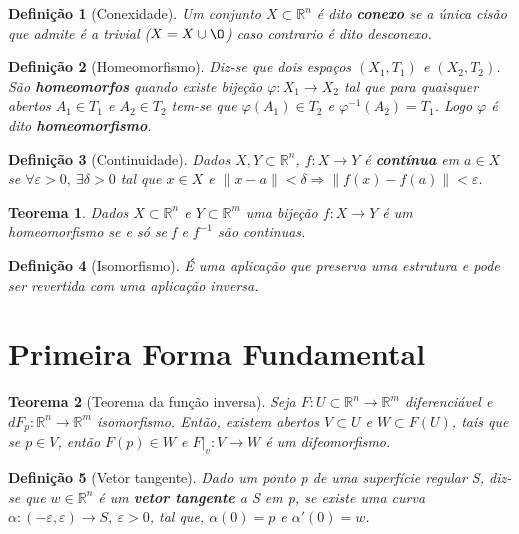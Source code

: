\documentclass[12pt]{article}
\newtheorem{theorem}{Teorema}
\newtheorem{definition}{Definição}
\begin{document}
\begin{definition}[Conexidade]
Um conjunto $X \subset \mathbb{R}^n$ é dito \textbf{conexo} se a única cisão que admite é a trivial ($X = X \cup \O$) caso contrario é dito desconexo.
\end{definition}

\begin{definition}[Homeomorfismo]
Diz-se que dois espaços $(X_1, T_1)$ e $(X_2, T_2)$. São \textbf{homeomorfos} quando existe bijeção $\varphi: X_1 \rightarrow X_2$ tal que para quaisquer abertos $A_1 \in T_1$ e $A_2 \in T_2$ tem-se que $\varphi(A_1) \in T_2$ e $\varphi^{-1}(A_2) = T_1$. Logo $\varphi$ é dito \textbf{homeomorfismo}.
\end{definition}

\begin{definition}[Continuidade]
Dados $X, Y \subset \mathbb{R}^n$, $f: X \rightarrow Y$ é \textbf{contínua} em $a \in X$ se $\forall \varepsilon > 0,\ \exists \delta > 0$ tal que $x \in X$ e $\| x - a \| < \delta \Rightarrow \| f(x) - f(a) \| < \varepsilon$.
\end{definition}

\begin{theorem}
Dados $X \subset \mathbb{R}^n$ e $Y \subset \mathbb{R}^m$ uma bijeção $f: X \rightarrow Y$ é um homeomorfismo se e só se f e $f^{-1}$ são continuas.
\end{theorem}

\begin{definition}[Isomorfismo]
É uma aplicação que preserva uma estrutura e pode ser revertida com uma aplicação inversa.
\end{definition}

\section*{Primeira Forma Fundamental}
\begin{theorem}[Teorema da função inversa]
Seja $F: U \subset \mathbb{R}^n \rightarrow \mathbb{R}^m$ diferenciável e $dF_p : \mathbb{R}^n \rightarrow \mathbb{R}^m$ isomorfismo. Então, existem abertos $V \subset U$ e $W \subset F(U)$, tais que se $p \in V$, então $F(p) \in W$ e $F|_v : V \rightarrow W$ é um difeomorfismo.
\end{theorem}

\begin{definition}[Vetor tangente]
Dado um ponto p de uma superfície regular S, diz-se que $w \in \mathbb{R}^n$ é um \textbf{vetor tangente} a S em p, se existe uma curva $\alpha: (- \varepsilon, \varepsilon) \rightarrow S,\ \varepsilon > 0$, tal que, $\alpha(0) = p$ e $\alpha'(0) = w$.
\end{definition}
\end{document}
